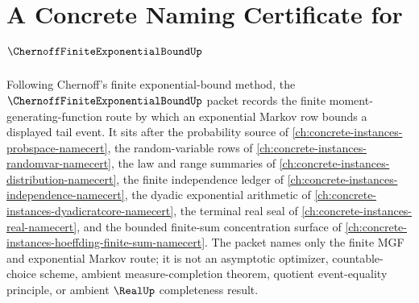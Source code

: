 \chapter{A Concrete Naming Certificate for $\ChernoffFiniteExponentialBoundUp$}
\label{ch:concrete-instances-chernoff-finite-exponential-bound-namecert}

Following Chernoff's finite exponential-bound method, the $\ChernoffFiniteExponentialBoundUp$ packet records the finite moment-generating-function route by which an exponential Markov row bounds a displayed tail event. It sits after the probability source of \autoref{ch:concrete-instances-probspace-namecert}, the random-variable rows of \autoref{ch:concrete-instances-randomvar-namecert}, the law and range summaries of \autoref{ch:concrete-instances-distribution-namecert}, the finite independence ledger of \autoref{ch:concrete-instances-independence-namecert}, the dyadic exponential arithmetic of \autoref{ch:concrete-instances-dyadicratcore-namecert}, the terminal real seal of \autoref{ch:concrete-instances-real-namecert}, and the bounded finite-sum concentration surface of \autoref{ch:concrete-instances-hoeffding-finite-sum-namecert}. The packet names only the finite MGF and exponential Markov route; it is not an asymptotic optimizer, countable-choice scheme, ambient measure-completion theorem, quotient event-equality principle, or ambient $\RealUp$ completeness result.

